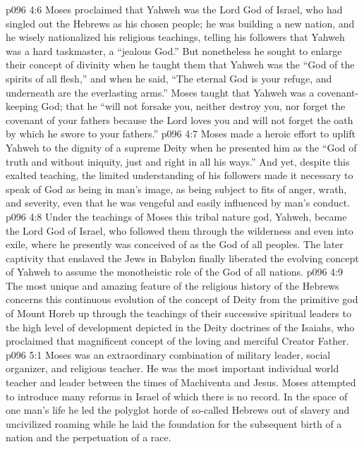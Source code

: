 \vs p096 4:6 Moses proclaimed that Yahweh was the Lord God of Israel, who had singled out the Hebrews as his chosen people; he was building a new nation, and he wisely nationalized his religious teachings, telling his followers that Yahweh was a hard taskmaster, a “jealous God.” But nonetheless he sought to enlarge their concept of divinity when he taught them that Yahweh was the “God of the spirits of all flesh,” and when he said, “The eternal God is your refuge, and underneath are the everlasting arms.” Moses taught that Yahweh was a covenant\hyp{}keeping God; that he “will not forsake you, neither destroy you, nor forget the covenant of your fathers because the Lord loves you and will not forget the oath by which he swore to your fathers.”
\vs p096 4:7 Moses made a heroic effort to uplift Yahweh to the dignity of a supreme Deity when he presented him as the “God of truth and without iniquity, just and right in all his ways.” And yet, despite this exalted teaching, the limited understanding of his followers made it necessary to speak of God as being in man’s image, as being subject to fits of anger, wrath, and severity, even that he was vengeful and easily influenced by man’s conduct.
\vs p096 4:8 Under the teachings of Moses this tribal nature god, Yahweh, became the Lord God of Israel, who followed them through the wilderness and even into exile, where he presently was conceived of as the God of all peoples. The later captivity that enslaved the Jews in Babylon finally liberated the evolving concept of Yahweh to assume the monotheistic role of the God of all nations.
\vs p096 4:9 The most unique and amazing feature of the religious history of the Hebrews concerns this continuous evolution of the concept of Deity from the primitive god of Mount Horeb up through the teachings of their successive spiritual leaders to the high level of development depicted in the Deity doctrines of the Isaiahs, who proclaimed that magnificent concept of the loving and merciful Creator Father.
\vs p096 5:1 Moses was an extraordinary combination of military leader, social organizer, and religious teacher. He was the most important individual world teacher and leader between the times of Machiventa and Jesus. Moses attempted to introduce many reforms in Israel of which there is no record. In the space of one man’s life he led the polyglot horde of so\hyp{}called Hebrews out of slavery and uncivilized roaming while he laid the foundation for the subsequent birth of a nation and the perpetuation of a race.

